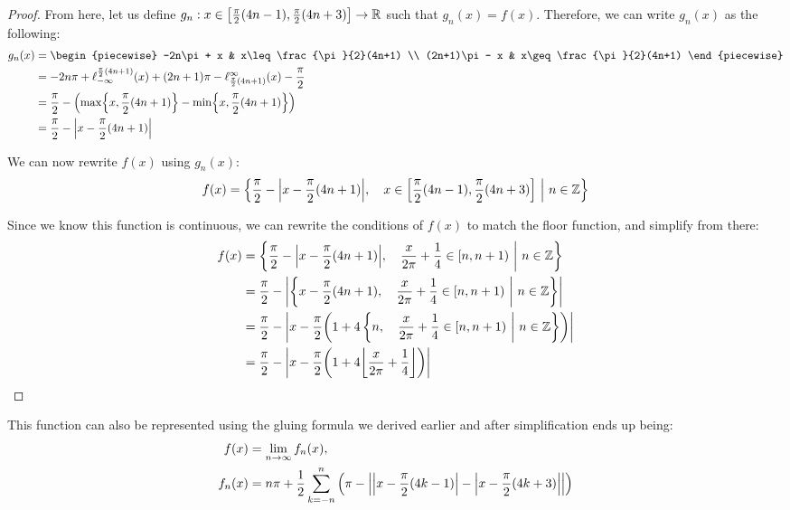 \begin{proof}
    From here, let us define $g_n:x\in\brak*{\frac{\pi}{2}(4n-1),\frac{\pi}{2}(4n+3)}\to\mathbb{R}$ such that $g_n(x)=f(x)$. Therefore, we can write $g_n(x)$ as the following:
    \begin{align*}
        g_n(x) &= \begin{piecewise}
            -2n\pi + x & x\leq \frac{\pi}{2}(4n+1) \\
            (2n+1)\pi - x & x\geq \frac{\pi}{2}(4n+1)
        \end{piecewise} \\
        &= -2n\pi+\ell_{-\infty}^{\frac{\pi}{2}(4n+1)}\paren*{x}+(2n+1)\pi-\ell_{\frac{\pi}{2}(4n+1)}^{\infty}\paren*{x}-\frac{\pi}{2} \\
        &= \frac{\pi}{2}-\paren*{\max\br*{x,\frac{\pi}{2}(4n+1)}-\min\br*{x,\frac{\pi}{2}(4n+1)}} \\
        &= \frac{\pi}{2}-\abs{x-\frac{\pi}{2}(4n+1)}
    \end{align*}

    We can now rewrite $f(x)$ using $g_n(x)$:
    $$
        f(x) = \pwobj{\frac{\pi}{2}-\abs{x-\frac{\pi}{2}(4n+1)}}{x\in\brak*{\frac{\pi}{2}(4n-1),\frac{\pi}{2}(4n+3)}}{n\in\mathbb{Z}}
    $$

    Since we know this function is continuous, we can rewrite the conditions of $f(x)$ to match the floor function, and simplify from there:
    \begin{align*}
        f(x) &= \pwobj{\frac{\pi}{2}-\abs{x-\frac{\pi}{2}(4n+1)}}{\frac{x}{2\pi}+\frac{1}{4}\in\brakp*{n,n+1}}{n\in\mathbb{Z}} \\
        &= \frac{\pi}{2}-\abs{\pwobj{x-\frac{\pi}{2}(4n+1)}{\frac{x}{2\pi}+\frac{1}{4}\in\brakp*{n,n+1}}{n\in\mathbb{Z}}} \\
        &= \frac{\pi}{2}-\abs{x-\frac{\pi}{2}\paren*{1+4\pwobj{n}{\frac{x}{2\pi}+\frac{1}{4}\in\brakp*{n,n+1}}{n\in\mathbb{Z}}}} \\
        &= \frac{\pi}{2}-\abs{x-\frac{\pi}{2}\paren*{1+4\floor*{\frac{x}{2\pi}+\frac{1}{4}}}}
    \end{align*}
\end{proof}
This function can also be represented using the gluing formula we derived earlier and after simplification ends up being:
\begin{align*}
    f(x) &= \lim_{n\to\infty}{f_n(x)}, \\
    f_n(x) &= n\pi+\frac{1}{2}\sum_{k=-n}^{n}{\paren*{\pi-\abs{\abs{x-\frac{\pi}{2}(4k-1)}-\abs{x-\frac{\pi}{2}(4k+3)}}}}
\end{align*}

